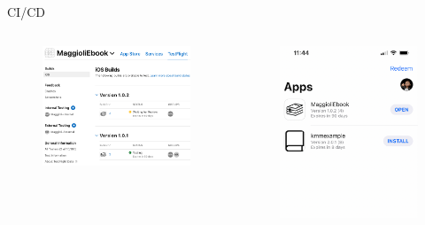     \begin{frame}{CI/CD}
        \begin{columns}[onlytextwidth]
            \begin{column}{0.6\textwidth}
                \begin{figure}[H]
                \centering
                \includegraphics[width=1\textwidth]{img/Screenshot 2022-10-05 at 11.34.06 (1).png}
                \end{figure}
            \end{column}
            \begin{column}{0.4\textwidth}
                \begin{figure}[H]
                \centering
                \includegraphics[width=1\textwidth]{img/Screenshot 2022-10-10 at 09.29.20.png}

\end{figure}
\end{column}
\end{columns}
\end{frame}
